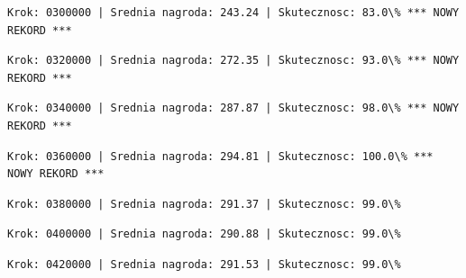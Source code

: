 \documentclass[11pt]{article}
\begin{document}
    
    
    \begin{Verbatim}[commandchars=\\\{\}]
Krok: 0300000 | Srednia nagroda: 243.24 | Skutecznosc: 83.0\% *** NOWY REKORD ***

    \end{Verbatim}

    
    
    \begin{Verbatim}[commandchars=\\\{\}]
Krok: 0320000 | Srednia nagroda: 272.35 | Skutecznosc: 93.0\% *** NOWY REKORD ***

    \end{Verbatim}

    
    
    \begin{Verbatim}[commandchars=\\\{\}]
Krok: 0340000 | Srednia nagroda: 287.87 | Skutecznosc: 98.0\% *** NOWY REKORD ***

    \end{Verbatim}

    
    
    \begin{Verbatim}[commandchars=\\\{\}]
Krok: 0360000 | Srednia nagroda: 294.81 | Skutecznosc: 100.0\% *** NOWY REKORD ***

    \end{Verbatim}

    
    
    \begin{Verbatim}[commandchars=\\\{\}]
Krok: 0380000 | Srednia nagroda: 291.37 | Skutecznosc: 99.0\%

    \end{Verbatim}

    
    
    \begin{Verbatim}[commandchars=\\\{\}]
Krok: 0400000 | Srednia nagroda: 290.88 | Skutecznosc: 99.0\%

    \end{Verbatim}

    
    
    \begin{Verbatim}[commandchars=\\\{\}]
Krok: 0420000 | Srednia nagroda: 291.53 | Skutecznosc: 99.0\%

    \end{Verbatim}
\end{document}
